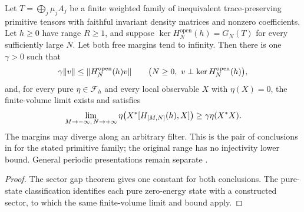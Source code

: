 \begin{theorem}
    \label{thm:eventual_kernel_pure_ground_state_gap}
    \leanok
    Let $T=\bigoplus_j\mu_jA_j$ be a finite weighted family of inequivalent
    trace-preserving primitive tensors with faithful invariant density matrices
    and nonzero coefficients. Let $h\geq0$ have range $R\geq1$, and suppose
    $\ker H_N^{\mathrm{open}}(h)=G_N(T)$ for every sufficiently large $N$.
    Let both free margins tend to infinity. Then there is one $\gamma>0$
    such that
    \begin{align}
        \gamma\|v\|\leq\|H_N^{\mathrm{open}}(h)v\|
        \qquad\bigl(N\geq0,\ v\perp\ker H_N^{\mathrm{open}}(h)\bigr),
        \notag
    \end{align}
    and, for every pure $\eta\in\mathcal F_h$ and every local observable
    $X$ with $\eta(X)=0$, the finite-volume limit exists and satisfies
    \begin{align}
        \lim_{M\to-\infty,\,N\to+\infty}
        \eta\bigl(X^*[H_{[M,N]}(h),X]\bigr)
        \geq\gamma\eta(X^*X).
        \notag
    \end{align}
    The margins may diverge along an arbitrary filter. This is the pair
    of conclusions in \cite[Theorem~1.2]{Nachtergaele1996Spectral} for
    the stated primitive family; the original range has no injectivity
    lower bound. General periodic presentations remain separate
    \cite{gap:nachtergaele96_infinite_volume_ground_projection}.
\end{theorem}
\begin{proof}\leanok
    The sector gap theorem gives one constant for both conclusions.
    The pure-state classification identifies each pure zero-energy state
    with a constructed sector, to which the same finite-volume limit and bound apply.
\end{proof}

